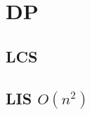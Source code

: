 %         

%         

\section{DP}
    \subsection{LCS}
        
    \subsection{LIS $O(n^2)$}
         
